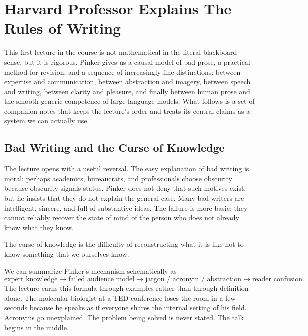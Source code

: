 \chapter{Harvard Professor Explains The Rules of Writing}

This first lecture in the course is not mathematical in the literal blackboard sense, but it is rigorous. Pinker gives us a causal model of bad prose, a practical method for revision, and a sequence of increasingly fine distinctions: between expertise and communication, between abstraction and imagery, between speech and writing, between clarity and pleasure, and finally between human prose and the smooth generic competence of large language models. What follows is a set of companion notes that keeps the lecture's order and treats its central claims as a system we can actually use.

\section{Bad Writing and the Curse of Knowledge}

The lecture opens with a useful reversal. The easy explanation of bad writing is moral: perhaps academics, bureaucrats, and professionals choose obscurity because obscurity signals status. Pinker does not deny that such motives exist, but he insists that they do not explain the general case. Many bad writers are intelligent, sincere, and full of substantive ideas. The failure is more basic: they cannot reliably recover the state of mind of the person who does not already know what they know.

\begin{definition}
The curse of knowledge is the difficulty of reconstructing what it is like not to know something that we ourselves know.
\end{definition}

We can summarize Pinker's mechanism schematically as
\begin{equation}
\text{expert knowledge} \to \text{failed audience model} \to \text{jargon / acronym / abstraction} \to \text{reader confusion}.
\end{equation}
The lecture earns this formula through examples rather than through definition alone. The molecular biologist at a TED conference loses the room in a few seconds because he speaks as if everyone shares the internal setting of his field. Acronyms go unexplained. The problem being solved is never stated. The talk begins in the middle.

